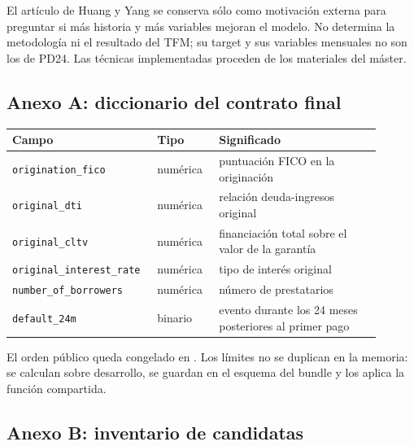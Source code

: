 \documentclass[10pt,a4paper]{article}
\begin{document}
El artículo de Huang y Yang se conserva sólo como motivación externa para
preguntar si más historia y más variables mejoran el modelo. No determina la
metodología ni el resultado del TFM; su target y sus variables mensuales no son
los de PD24. Las técnicas implementadas proceden de los materiales del máster.

\clearpage
\subsection{Anexo A: diccionario del contrato final}

\begin{center}\small
\begin{tabular}{p{0.32\linewidth} p{0.16\linewidth} p{0.42\linewidth}}
\textbf{Campo} & \textbf{Tipo} & \textbf{Significado}\\ \hline
\texttt{origination\_fico} & numérica & puntuación FICO en la originación\\
\texttt{original\_dti} & numérica & relación deuda-ingresos original\\
\texttt{original\_cltv} & numérica & financiación total sobre el valor de la garantía\\
\texttt{original\_interest\_rate} & numérica & tipo de interés original\\
\texttt{number\_of\_borrowers} & numérica & número de prestatarios\\
\texttt{default\_24m} & binario & evento durante los 24 meses posteriores al primer pago\\
\end{tabular}
\end{center}

El orden público queda congelado en . Los límites no se
duplican en la memoria: se calculan sobre desarrollo, se guardan en el esquema
del bundle y los aplica la función compartida.

\clearpage
\subsection{Anexo B: inventario de candidatas}
\end{document}
